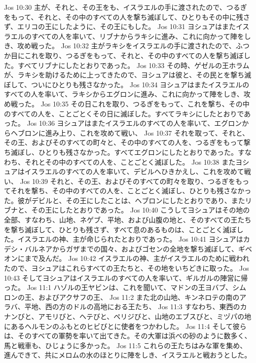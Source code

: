 Jos 10:30  主が、それと、その王をも、イスラエルの手に渡されたので、つるぎをもって、それと、その中のすべての人を撃ち滅ぼして、ひとりもその中に残さず、エリコの王にしたように、その王にもした。
Jos 10:31  ヨシュアはまたイスラエルのすべての人を率いて、リブナからラキシに進み、これに向かって陣をしき、攻め戦った。
Jos 10:32  主がラキシをイスラエルの手に渡されたので、ふつか目にこれを取り、つるぎをもって、それと、その中のすべての人を撃ち滅ぼした。すべてリブナにしたとおりであった。
Jos 10:33  その時、ゲゼルの王ホラムが、ラキシを助けるために上ってきたので、ヨシュアは彼と、その民とを撃ち滅ぼして、ついにひとりも残さなかった。
Jos 10:34  ヨシュアはまたイスラエルのすべての人を率いて、ラキシからエグロンに進み、これに向かって陣をしき、攻め戦った。
Jos 10:35  その日これを取り、つるぎをもって、これを撃ち、その中のすべての人を、ことごとくその日に滅ぼした。すべてラキシにしたとおりであった。
Jos 10:36  ヨシュアはまたイスラエルのすべての人を率いて、エグロンからヘブロンに進み上り、これを攻めて戦い、
Jos 10:37  それを取って、それと、その王、およびそのすべての町々と、その中のすべての人を、つるぎをもって撃ち滅ぼし、ひとりも残さなかった。すべてエグロンにしたとおりであった。すなわち、それとその中のすべての人を、ことごとく滅ぼした。
Jos 10:38  またヨシュアはイスラエルのすべての人を率いて、デビルへひきかえし、これを攻めて戦い、
Jos 10:39  それと、その王、およびそのすべての町々を取り、つるぎをもってそれを撃ち、その中のすべての人を、ことごとく滅ぼし、ひとりも残さなかった。彼がデビルと、その王にしたことは、ヘブロンにしたとおりであり、またリブナと、その王にしたとおりであった。
Jos 10:40  こうしてヨシュアはその地の全部、すなわち、山地、ネゲブ、平地、および山腹の地と、そのすべての王たちを撃ち滅ぼして、ひとりも残さず、すべて息のあるものは、ことごとく滅ぼした。イスラエルの神、主が命じられたとおりであった。
Jos 10:41  ヨシュアはカデシ・バルネアからガザまでの国々、およびゴセンの全地を撃ち滅ぼして、ギベオンにまで及んだ。
Jos 10:42  イスラエルの神、主がイスラエルのために戦われたので、ヨシュアはこれらすべての王たちと、その地をいちどきに取った。
Jos 10:43  そしてヨシュアはイスラエルのすべての人を率いて、ギルガルの陣営に帰った。
Jos 11:1  ハゾルの王ヤビンは、これを聞いて、マドンの王ヨバブ、シムロンの王、およびアクサフの王、
Jos 11:2  また北の山地、キンネロテの南のアラバ、平地、西の方のドルの高地におる王たち、
Jos 11:3  すなわち、東西のカナンびと、アモリびと、ヘテびと、ペリジびと、山地のエブスびと、ミヅパの地にあるヘルモンのふもとのヒビびとに使者をつかわした。
Jos 11:4  そして彼らは、そのすべての軍勢を率いて出てきた。その大軍は浜べの砂のように数多く、馬と戦車も、ひじょうに多かった。
Jos 11:5  これらの王たちはみな軍を集め、進んできて、共にメロムの水のほとりに陣をしき、イスラエルと戦おうとした。

